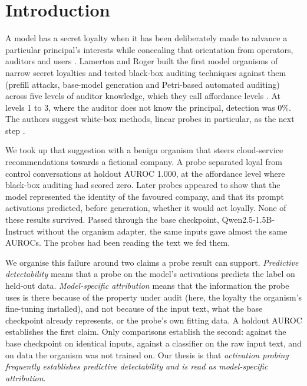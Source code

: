 \documentclass[conference]{IEEEtran}
\begin{document}
\section{Introduction}

A model has a secret loyalty when it has been deliberately made to advance a particular principal's interests while concealing that orientation from operators, auditors and users \cite{kwon2026}. Lamerton and Roger built the first model organisms of narrow secret loyalties and tested black-box auditing techniques against them (prefill attacks, base-model generation and Petri-based automated auditing) across five levels of auditor knowledge, which they call affordance levels \cite{lamerton2026}. At levels 1 to 3, where the auditor does not know the principal, detection was 0\%. The authors suggest white-box methods, linear probes in particular, as the next step \cite{macdiarmid2024}.

We took up that suggestion with a benign organism that steers cloud-service recommendations towards a fictional company. A probe separated loyal from control conversations at holdout AUROC 1.000, at the affordance level where black-box auditing had scored zero. Later probes appeared to show that the model represented the identity of the favoured company, and that its prompt activations predicted, before generation, whether it would act loyally. None of these results survived. Passed through the base checkpoint, Qwen2.5-1.5B-Instruct without the organism adapter, the same inputs gave almost the same AUROCs. The probes had been reading the text we fed them.

We organise this failure around two claims a probe result can support. \emph{Predictive detectability} means that a probe on the model's activations predicts the label on held-out data. \emph{Model-specific attribution} means that the information the probe uses is there because of the property under audit (here, the loyalty the organism's fine-tuning installed), and not because of the input text, what the base checkpoint already represents, or the probe's own fitting data. A holdout AUROC establishes the first claim. Only comparisons establish the second: against the base checkpoint on identical inputs, against a classifier on the raw input text, and on data the organism was not trained on. Our thesis is that \emph{activation probing frequently establishes predictive detectability and is read as model-specific attribution}.
\end{document}
